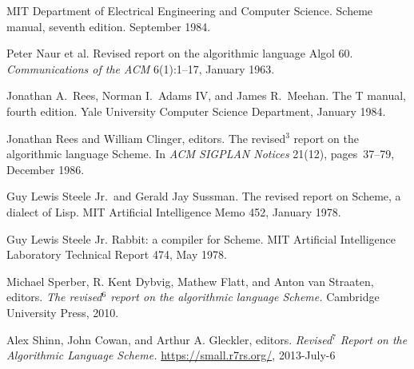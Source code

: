 \begin{thebibliography}{999}
MIT Department of Electrical Engineering and Computer Science.
Scheme manual, seventh edition.
September 1984.

Peter Naur et al.
Revised report on the algorithmic language Algol 60.
{\em Communications of the ACM} 6(1):1--17, January 1963.



Jonathan A.~Rees, Norman I.~Adams IV, and James R.~Meehan.
The T manual, fourth edition.
Yale University Computer Science Department, January 1984.

Jonathan Rees and William Clinger, editors.
The revised$^3$ report on the algorithmic language Scheme.
In {\em ACM SIGPLAN Notices} 21(12), pages~37--79, December 1986.


Guy Lewis Steele Jr.~and Gerald Jay Sussman.
The revised report on Scheme, a dialect of Lisp.
MIT Artificial Intelligence Memo 452, January 1978.

Guy Lewis Steele Jr.
Rabbit: a compiler for Scheme.
MIT Artificial Intelligence Laboratory Technical Report 474, May 1978.

Michael Sperber, R. Kent Dybvig, Mathew Flatt, and Anton van Straaten, editors.
{\em The revised$^6$ report on the algorithmic language Scheme.}
Cambridge University Press, 2010.

  Alex Shinn, John Cowan, and Arthur A. Gleckler, editors.
  {\em Revised$^7$ Report on the Algorithmic Language Scheme.}
  \url{https://small.r7rs.org/}, 2013-July-6


\end{thebibliography}

